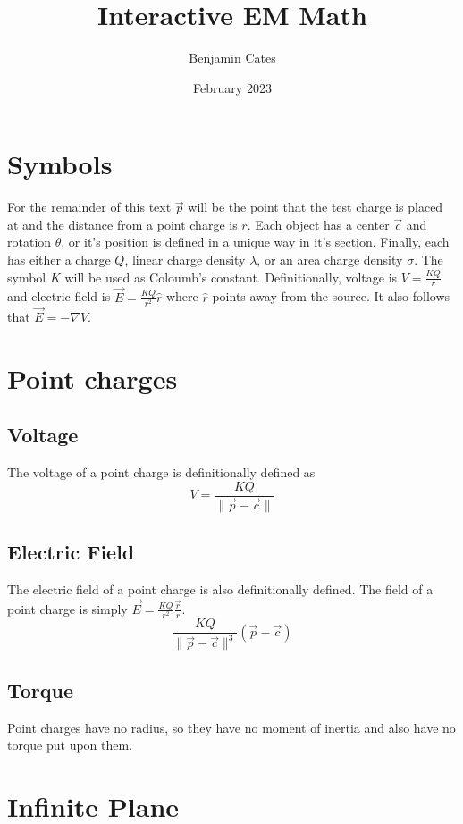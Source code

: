 \documentclass{article}
\title{Interactive EM Math}
\author{Benjamin Cates}
\date{February 2023}
\begin{document}
\maketitle
\section{Symbols}
For the remainder of this text $\vec{p}$ will be the point that the test charge is placed at and the distance from a point charge is $r$. Each object has a center $\vec{c}$ and rotation $\theta$, or it's position is defined in a unique way in it's section. Finally, each has either a charge $Q$, linear charge density $\lambda$, or an area charge density $\sigma$. The symbol $K$ will be used as Coloumb's constant. Definitionally, voltage is $V=\frac{KQ}{r}$ and electric field is $\vec{E}=\frac{KQ}{r^2}\hat{r}$ where $\hat{r}$ points away from the source. It also follows that $\vec{E} = -\nabla V$.

\section{Point charges}
\subsection{Voltage}
The voltage of a point charge is definitionally defined as
\begin{equation}
    V=\frac{KQ}{\lVert \vec{p}-\vec{c}\rVert }
\end{equation}
\subsection{Electric Field}
The electric field of a point charge is also definitionally defined.
The field of a point charge is simply $\vec{E} = \frac{KQ}{r^2}\frac{\vec{r}}{r}$.
\begin{equation}
\frac{KQ}{\lVert \vec{p}-\vec{c} \rVert^3}(\vec{p}-\vec{c})
\end{equation}
\subsection{Torque}
Point charges have no radius, so they have no moment of inertia and also have no torque put upon them.
\section{Infinite Plane}
\end{document}
